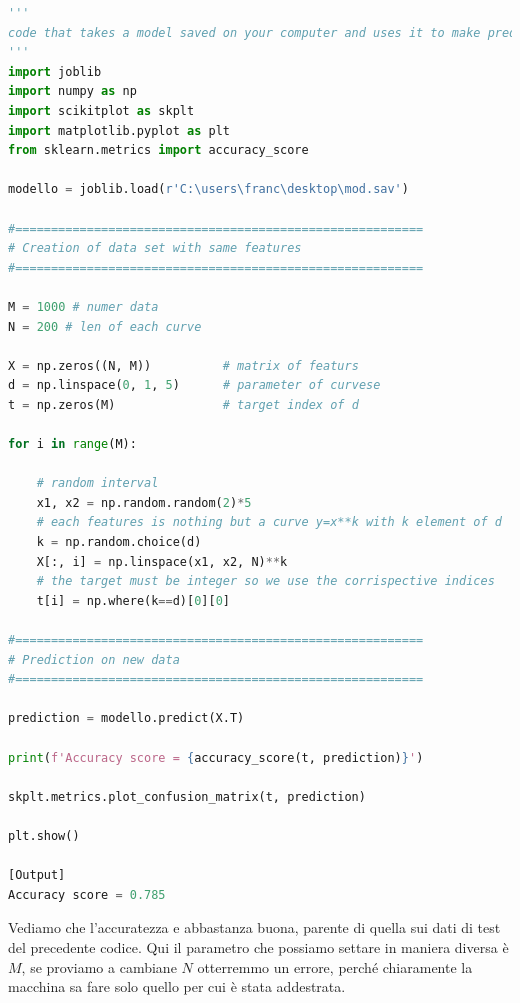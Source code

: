 \documentclass[10pt,a4paper]{article}
\begin{document}
\begin{lstlisting}[language=Python]
'''
code that takes a model saved on your computer and uses it to make predictions
'''
import joblib
import numpy as np
import scikitplot as skplt
import matplotlib.pyplot as plt
from sklearn.metrics import accuracy_score

modello = joblib.load(r'C:\users\franc\desktop\mod.sav')

#=========================================================
# Creation of data set with same features
#=========================================================

M = 1000 # numer data
N = 200 # len of each curve

X = np.zeros((N, M))          # matrix of featurs
d = np.linspace(0, 1, 5)      # parameter of curvese
t = np.zeros(M)               # target index of d

for i in range(M):

    # random interval
    x1, x2 = np.random.random(2)*5
    # each features is nothing but a curve y=x**k with k element of d
    k = np.random.choice(d)
    X[:, i] = np.linspace(x1, x2, N)**k
    # the target must be integer so we use the corrispective indices
    t[i] = np.where(k==d)[0][0]

#=========================================================
# Prediction on new data
#=========================================================

prediction = modello.predict(X.T)

print(f'Accuracy score = {accuracy_score(t, prediction)}')

skplt.metrics.plot_confusion_matrix(t, prediction)

plt.show()

[Output]
Accuracy score = 0.785

\end{lstlisting}
Vediamo che l'accuratezza e abbastanza buona, parente di quella sui dati di test del precedente codice. Qui il parametro che possiamo settare in maniera diversa è $M$, se proviamo a cambiane $N$ otterremmo un errore, perché chiaramente la macchina sa fare solo quello per cui è stata addestrata.
\end{document}
